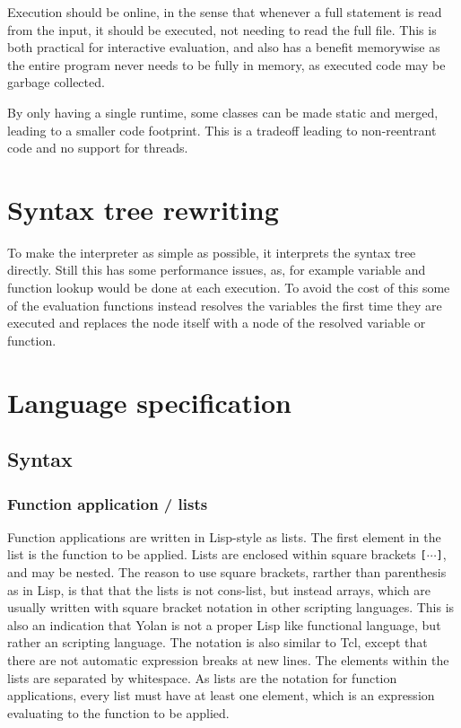 \documentclass[11pt]{report}
\begin{document}
Execution should be online, in the sense that whenever a full statement is read from the input, it should be executed, not needing to read the full file. This is both practical for interactive evaluation, and also has a benefit memorywise as the entire program never needs to be fully in memory, as executed code may be garbage collected.

By only having a single runtime, some classes can be made static and merged, leading to a smaller code footprint. This is a tradeoff leading to non-reentrant code and no support for threads.

\section{Syntax tree rewriting}

To make the interpreter as simple as possible, it interprets the syntax tree directly. Still this has some performance issues, as, for example variable and function lookup would be done at each execution. To avoid the cost of this some of the evaluation functions instead resolves the variables the first time they are executed and replaces the node itself with a node of the resolved variable or function.

\section{Language specification}

\subsection{Syntax}
\subsubsection{Function application / lists}
Function applications are written in Lisp-style as lists. The first element in the list is the function to be applied.
Lists are enclosed within square brackets \verb|[|$\cdots$\verb|]|, and may be nested. 
The reason to use square brackets, rarther than parenthesis as in Lisp, is that that the lists is not cons-list, but instead arrays, which are usually written with square bracket notation in other scripting languages. This is also an indication that Yolan is not a proper Lisp like functional language, but rather an scripting language. The notation is also similar to Tcl, except that there are not automatic expression breaks at new lines.
The elements within the lists are separated by whitespace. 
As lists are the notation for function applications, every list must have at least one element, which is an expression evaluating to the function to be applied.
\end{document}
